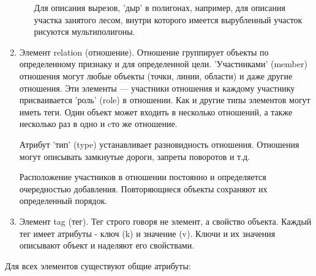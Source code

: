 \documentclass[12pt,a4paper,oneside]{article} %
\begin{document}
\begin{enumerate}
\begin{itemize}
Для описания вырезов, 'дыр' в полигонах, например, для описания \linebreak
участка занятого лесом, внутри которого имеется вырубленный \linebreak
участок рисуются мультиполигоны.
\end{itemize}
\item Элемент relation (отношение). Отношение группирует объекты по \linebreak
определенному признаку и для определенной цели. 'Участниками' \linebreak
(member) отношения могут любые объекты (точки, линии, области) и \linebreak
даже другие отношения. Эти элементы — участники отношения и \linebreak
каждому участнику присваивается 'роль' (role) в отношении. Как и \linebreak
другие типы элементов могут иметь теги. Один объект может \linebreak
входить в несколько отношений, а также несколько раз в одно и \linebreak
cто же отношение.

    Атрибут 'тип' (type) устанавливает разновидность отношения. \linebreak
    Отношения могут описывать замкнутые дороги, запреты поворотов и т.д.

    Расположение участников в отношении постоянно и определяется \linebreak
    очередностью добавления. Повторяющиеся объекты сохраняют их \linebreak
    определенный порядок.

\item Элемент tag (тег). Тег строго говоря не элемент, а свойство объекта. \linebreak
Каждый тег имеет атрибуты - ключ (k) и значение (v). Ключи и их \linebreak
значения описывают объект и наделяют его свойствами.
\end{enumerate}

Для всех элементов существуют общие атрибуты:
\end{document}
